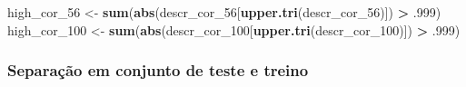 \documentclass[]{article}
\newenvironment{Shaded}{\begin{snugshade}}{\end{snugshade}}
\newcommand{\DecValTok}[1]{\textcolor[rgb]{0.00,0.00,0.81}{#1}}
\newcommand{\FloatTok}[1]{\textcolor[rgb]{0.00,0.00,0.81}{#1}}
\newcommand{\KeywordTok}[1]{\textcolor[rgb]{0.13,0.29,0.53}{\textbf{#1}}}
\newcommand{\NormalTok}[1]{#1}
\newcommand{\OperatorTok}[1]{\textcolor[rgb]{0.81,0.36,0.00}{\textbf{#1}}}
\newcommand{\StringTok}[1]{\textcolor[rgb]{0.31,0.60,0.02}{#1}}
\begin{document}
\begin{Shaded}
\begin{Highlighting}[]
\NormalTok{high_cor_}\DecValTok{56}\NormalTok{ <-}\StringTok{ }\KeywordTok{sum}\NormalTok{(}\KeywordTok{abs}\NormalTok{(descr_cor_}\DecValTok{56}\NormalTok{[}\KeywordTok{upper.tri}\NormalTok{(descr_cor_}\DecValTok{56}\NormalTok{)]) }\OperatorTok{>}\StringTok{ }\FloatTok{.999}\NormalTok{)}
\NormalTok{high_cor_}\DecValTok{100}\NormalTok{ <-}\StringTok{ }\KeywordTok{sum}\NormalTok{(}\KeywordTok{abs}\NormalTok{(descr_cor_}\DecValTok{100}\NormalTok{[}\KeywordTok{upper.tri}\NormalTok{(descr_cor_}\DecValTok{100}\NormalTok{)]) }\OperatorTok{>}\StringTok{ }\FloatTok{.999}\NormalTok{)}
\end{Highlighting}
\end{Shaded}

\hypertarget{separauxe7uxe3o-em-conjunto-de-teste-e-treino}{%
\subsubsection{Separação em conjunto de teste e
treino}\label{separauxe7uxe3o-em-conjunto-de-teste-e-treino}}

\label{show-split}
\end{document}

